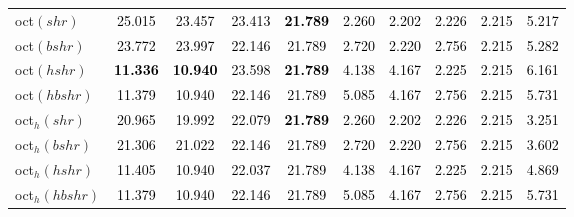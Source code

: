 \begin{tabular}[t]{>{\centering\arraybackslash}m{2.5cm}ccccccccc}
oct$(shr)$ & \textcolor{black}{25.015} & \textcolor{black}{23.457} & \textcolor{black}{23.413} & \textcolor{black}{\textbf{21.789}} & \textcolor{black}{2.260} & \textcolor{black}{2.202} & \textcolor{black}{2.226} & \textcolor{black}{2.215} & \textcolor{black}{5.217}\\
oct$(bshr)$ & \textcolor{black}{23.772} & \textcolor{black}{23.997} & \textcolor{black}{22.146} & \textcolor{black}{21.789} & \textcolor{black}{2.720} & \textcolor{black}{2.220} & \textcolor{black}{2.756} & \textcolor{black}{2.215} & \textcolor{black}{5.282}\\
oct$(hshr)$ & \textcolor{black}{\textbf{11.336}} & \textcolor{black}{\textbf{10.940}} & \textcolor{black}{23.598} & \textcolor{black}{\textbf{21.789}} & \textcolor{black}{4.138} & \textcolor{black}{4.167} & \textcolor{black}{2.225} & \textcolor{black}{2.215} & \textcolor{black}{6.161}\\
oct$(hbshr)$ & \textcolor{black}{11.379} & \textcolor{black}{10.940} & \textcolor{black}{22.146} & \textcolor{black}{21.789} & \textcolor{black}{5.085} & \textcolor{black}{4.167} & \textcolor{black}{2.756} & \textcolor{black}{2.215} & \textcolor{black}{5.731}\\
oct$_h(shr)$ & \textcolor{black}{20.965} & \textcolor{black}{19.992} & \textcolor{black}{22.079} & \textcolor{black}{\textbf{21.789}} & \textcolor{black}{2.260} & \textcolor{black}{2.202} & \textcolor{black}{2.226} & \textcolor{black}{2.215} & \textcolor{black}{3.251}\\
oct$_h(bshr)$ & \textcolor{black}{21.306} & \textcolor{black}{21.022} & \textcolor{black}{22.146} & \textcolor{black}{21.789} & \textcolor{black}{2.720} & \textcolor{black}{2.220} & \textcolor{black}{2.756} & \textcolor{black}{2.215} & \textcolor{black}{3.602}\\
oct$_h(hshr)$ & \textcolor{black}{11.405} & \textcolor{black}{10.940} & \textcolor{black}{22.037} & \textcolor{black}{21.789} & \textcolor{black}{4.138} & \textcolor{black}{4.167} & \textcolor{black}{2.225} & \textcolor{black}{2.215} & \textcolor{black}{4.869}\\
oct$_h(hbshr)$ & \textcolor{black}{11.379} & \textcolor{black}{10.940} & \textcolor{black}{22.146} & \textcolor{black}{21.789} & \textcolor{black}{5.085} & \textcolor{black}{4.167} & \textcolor{black}{2.756} & \textcolor{black}{2.215} & \textcolor{black}{5.731}\\
\bottomrule
\end{tabular}
